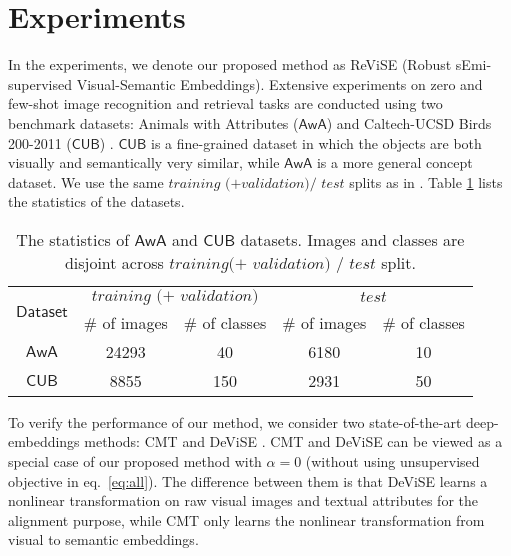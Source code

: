 \section{Experiments}
\label{sec:exp}
{
In the experiments, we denote our proposed method as ReViSE (Robust sEmi-supervised Visual-Semantic Embeddings). Extensive experiments on zero and few-shot image recognition and retrieval tasks are conducted using two benchmark datasets: Animals with Attributes ($\mathsf{AwA}$) \cite{lampert2014attribute} and Caltech-UCSD Birds 200-2011 ($\mathsf{CUB}$) \cite{WelinderEtal2010}. $\mathsf{CUB}$ is a fine-grained dataset in which the objects are both visually and semantically very similar, while $\mathsf{AwA}$ is a more general concept dataset. We use the same $\textit{training (+validation)/ test}$ splits as in \cite{akata2015evaluation,xian2016latent}. Table \ref{tbl:dataset_stat} lists the statistics of the datasets.

\begin{table}[t!]
\centering
\caption{\footnotesize The statistics of $\mathsf{AwA}$ and $\mathsf{CUB}$ datasets. Images and classes are disjoint across $\textit{training(+ validation)}$ / $\textit{test}$ split.}
\vspace{1mm}
\scalebox{0.8}
{
\begin{tabular}{|c||cc||cc|}
\hline
\multirow{2}{*}{$\mathsf{Dataset}$} & \multicolumn{2}{|c||}{$\textit{training (+ validation)}$} & \multicolumn{2}{c|}{$\textit{test}$}    \\ 
                         & \# of images          & \# of classes         & \# of images & \# of classes \\ \hline \hline
$\mathsf{AwA}$ \cite{lampert2014attribute}                     & 24293                 & 40                    & 6180         & 10            \\$\mathsf{CUB}$ \cite{WelinderEtal2010}                     & 8855                  & 150                   & 2931         & 50            \\ \hline
\end{tabular}
}
\label{tbl:dataset_stat}
\vspace{-4mm}
\end{table}


To verify the performance of our method, we consider two state-of-the-art deep-embeddings methods: CMT \cite{socher2013zero} and DeViSE \cite{frome2013devise}. CMT and DeViSE can be viewed as a special case of our proposed method with $\alpha = 0$ (without using unsupervised objective in eq.~\eqref{eq:all}). The difference between them is that DeViSE learns a nonlinear transformation on raw visual images and textual attributes for the alignment purpose, while CMT only learns the nonlinear transformation from visual to semantic embeddings. 

}
